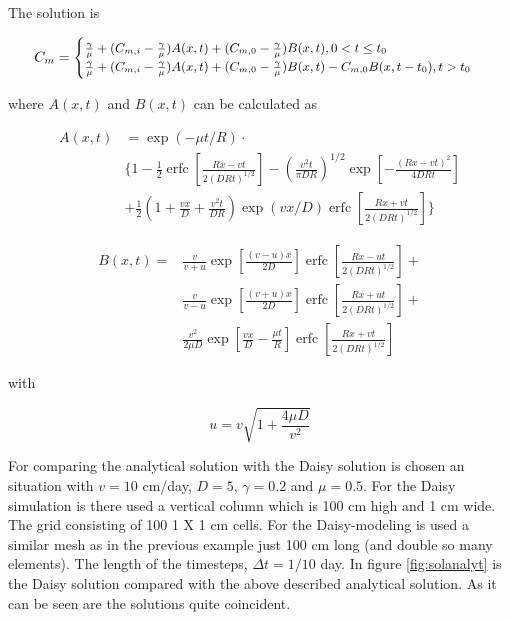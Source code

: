 \documentclass{report}
\newcommand{\erfc}{\operatorname{erfc}}                 %
\begin{document}
The solution is

\begin{equation}
\begin{small}
C_m=\begin{cases}\frac{\gamma}{\mu}+ (C_{m,i}-\frac{\gamma}{\mu})A(x,t)+(C_{m,0}-\frac{\gamma}{\mu})B(x,t), 0<t\leq t_0 \\
\frac{\gamma}{\mu} + (C_{m,i}-\frac{\gamma}{\mu})A(x,t)+(C_{m,0}-\frac{\gamma}{\mu})B(x,t)-C_{m,0}B(x,t-t_0), t>t_0
\end{cases}
\end{small}
\end{equation}

where $A(x,t)$ and $B(x,t)$ can be calculated as

\begin{equation}
\begin{split}
A(x,t) & =\exp(-\mu t/R)\cdot \\
& \bigg\{ 1-\frac{1}{2}\erfc\left[\frac{Rx-vt}{2(DRt)^{1/2}}\right]
-\left(\frac{v^2t}{\pi
    DR}\right)^{1/2}\exp\left[-\frac{(Rx-vt)^2}{4DRt}\right] \\ &
+\frac{1}{2}\left(1+\frac{vx}{D}+\frac{v^2t}{DR}\right)\exp(vx/D)\erfc\left[\frac{Rx+vt}{2(DRt)^{1/2}}\right]
\bigg\}
\end{split}
\end{equation}

\begin{equation}
\begin{split}
B(x,t)=&\frac{v}{v+u}\exp\left[\frac{(v-u)x}{2D}\right]\erfc\left[\frac{Rx-ut}{2(DRt)^{1/2}}\right]
+\\
&
\frac{v}{v-u}\exp\left[\frac{(v+u)x}{2D}\right]\erfc\left[\frac{Rx+ut}{2(DRt)^{1/2}}\right]
+\\ &
 \frac{v^2}{2\mu D}\exp\left[\frac{vx}{D}-\frac{\mu
     t}{R}\right]\erfc\left[\frac{Rx+vt}{2(DRt)^{1/2}}\right]
\end{split}
\end{equation}

with

\begin{equation}
u=v \sqrt{1+\frac{4\mu D}{v^2}}
\end{equation}


For comparing the analytical solution with the Daisy solution is
chosen an situation with $v=10$ cm/day, $D=5$, $\gamma=0.2$
and $\mu=0.5$. For the Daisy simulation is there used a vertical
column which is 100 cm high and 1 cm wide. The grid consisting of
100 1 X 1 cm cells. For the Daisy-modeling is used a similar mesh
as in the previous example just 100 cm long (and double so many
elements). The length of the timesteps, $\Delta t=1/10$ day. In
figure \ref{fig:solanalyt} is the Daisy solution compared with the
above described analytical solution. As it can be seen are the
solutions quite coincident.
\end{document}
